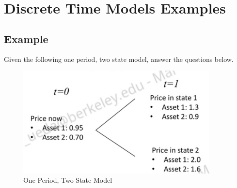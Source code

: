 \documentclass[11pt]{article}
\begin{document}
\section{Discrete Time Models Examples}
\subsection{Example}
Given the following one period, two state model, answer the questions below. 
\begin{figure}[H] 
    \centering 
    \includegraphics[width=4in]{imgs/example1.png}
    \caption{One Period, Two State Model}
\end{figure}
\end{document}
